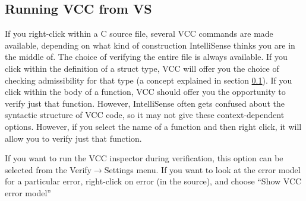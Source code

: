 \subsection{Running VCC from VS}
If you right-click within a C source file,
several VCC commands are made available, depending on what kind of
construction IntelliSense thinks you are in the middle of. The choice
of verifying the entire file is always available. If you click within
the definition of a struct type, VCC will offer you the choice of
checking admissibility for that type (a concept explained in
section \ref{}). If you click within the body of a function, VCC should offer
you the opportunity to verify just that function. However,
IntelliSense often gets confused about the syntactic structure of
VCC code, so it may not give these context-dependent
options. However, if you select the name of a function and then right
click, it will allow you to verify just that function.

If you want to run the VCC inspector during verification, this
option can be selected from the Verify$\rightarrow$Settings menu. If you want
to look at the error model for a particular error, right-click on
error (in the source), and choose ``Show VCC error model''
